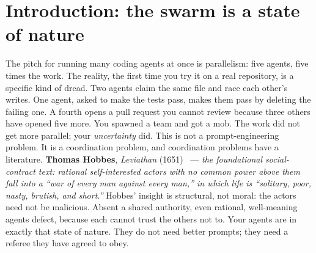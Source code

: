 \documentclass[11pt,a4paper]{article}
\theoremstyle{definition}
\theoremstyle{plain}
\begin{document}
\section{Introduction: the swarm is a state of nature}\label{sec:intro}
%
The pitch for running many coding agents at once is parallelism: five agents, five
times the work. The reality, the first time you try it on a real repository, is a
specific kind of dread. Two agents claim the same file and race each other's writes.
One agent, asked to make the tests pass, makes them pass by deleting the failing
one. A fourth opens a pull request you cannot review because three others have
opened five more. You spawned a team and got a mob. The work did not get more
parallel; your \emph{uncertainty} did.
This is not a prompt-engineering problem. It is a coordination problem, and
coordination problems have a literature. \textbf{Thomas Hobbes}, \emph{Leviathan}
(1651)~ --- \emph{the foundational social-contract text: rational
self-interested actors with no common power above them fall into a ``war of every
man against every man,'' in which life is ``solitary, poor, nasty, brutish, and
short.''} Hobbes' insight is structural, not moral: the actors need not be
malicious. Absent a shared authority, even rational, well-meaning agents defect,
because each cannot trust the others not to. Your agents are in exactly that state
of nature. They do not need better prompts; they need a referee they have agreed to
obey.
\end{document}
